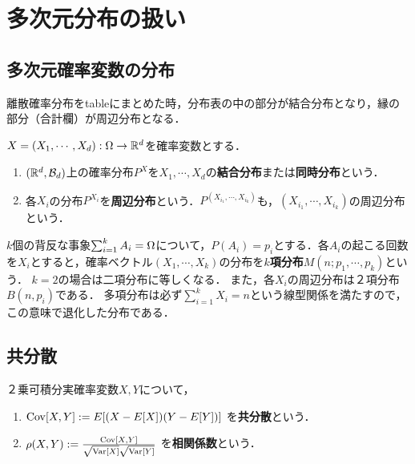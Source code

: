 \documentclass[uplatex,dvipdfmx]{jsreport}
\begin{document}
\section{多次元分布の扱い}

\subsection{多次元確率変数の分布}

\begin{tcolorbox}[colframe=ForestGreen, colback=ForestGreen!10!white,breakable,colbacktitle=ForestGreen!40!white,coltitle=black,fonttitle=\bfseries\sffamily,
    title=]
    離散確率分布をtableにまとめた時，分布表の中の部分が結合分布となり，縁の部分（合計欄）が周辺分布となる．
\end{tcolorbox}

\begin{definition}
    $X=(X_1,\cdots,X_d):\Omega\to\mathbb{R}^d$を確率変数とする．
    \begin{enumerate}
        \item $(\mathbb{R}^d,\mathcal{B}_d)$上の確率分布$P^X$を$X_1,\cdots,X_d$の\textbf{結合分布}または\textbf{同時分布}という．
        \item 各$X_i$の分布$P^{X_i}$を\textbf{周辺分布}という．$P^{(X_{i_1},\cdots,X_{i_k})}$も，$(X_{i_1},\cdots,X_{i_k})$の周辺分布という．
    \end{enumerate}
\end{definition}

\begin{example}
    $k$個の背反な事象$\sum^k_{i=1}A_i=\Omega$について，$P(A_i)=p_i$とする．各$A_i$の起こる回数を$X_i$とすると，確率ベクトル$(X_1,\cdots,X_k)$の分布を\textbf{$k$項分布}$M(n;p_1,\cdots,p_k)$という．
    $k=2$の場合は二項分布に等しくなる．
    また，各$X_i$の周辺分布は２項分布$B(n,p_i)$である．
    多項分布は必ず$\sum_{i=1}^kX_i=n$という線型関係を満たすので，この意味で退化した分布である．
\end{example}

\subsection{共分散}

\begin{definition}
    ２乗可積分実確率変数$X,Y$について，
    \begin{enumerate}
        \item 
        $\mathrm{Cov}[X,Y]:=E[(X-E[X])(Y-E[Y])]$
        を\textbf{共分散}という．
        \item $\rho(X,Y):=\frac{\mathrm{Cov}[X,Y]}{\sqrt{\mathrm{Var}[X]}\sqrt{\mathrm{Var}[Y]}}$
        を\textbf{相関係数}という．
    \end{enumerate}
\end{definition}
\end{document}
